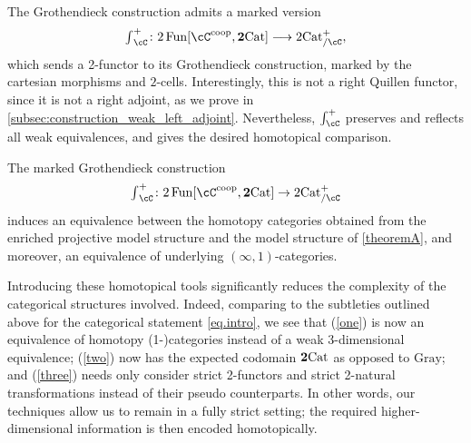 \documentclass[11pt, dvipsnames]{amsart}
\begin{document}
The Grothendieck construction admits a marked version 
\[
  {\textstyle\int}_\cC^+\colon 2\Fun[\cC^{\coop},\ttwocat]
  \longrightarrow \twocat^{+}_{/ \cC},
\]
which sends a 2-functor to its Grothendieck construction, marked by the cartesian morphisms and $2$-cells. Interestingly, this is not a right Quillen functor, since it is not a right adjoint, as we prove in \cref{subsec:construction_weak_left_adjoint}. %
Nevertheless, $\int_\cC^+$ preserves and reflects all weak equivalences, and gives the desired homotopical comparison. 
\begin{theoremA}
The marked Grothendieck construction
\[{\textstyle\int}_\cC^+\colon 2\Fun[\cC^{\coop},\ttwocat] \to\twocat^{+}_{/ \cC}\] 
induces an equivalence between the homotopy categories obtained from the enriched projective model structure and the model structure of \cref{theoremA}, and moreover, an equivalence of underlying $(\infty,1)$-categories.
\end{theoremA}

Introducing these homotopical tools significantly reduces the complexity of the categorical structures involved. Indeed, comparing to the subtleties outlined above for the categorical statement  \eqref{eq.intro}, we see that (\ref{one}) is now an equivalence of homotopy (1-)categories instead of a weak 3-dimensional equivalence; (\ref{two}) now has the expected codomain $\mathbf{2}\mathrm{Cat}$ as opposed to $\mathrm{Gray}$; and (\ref{three}) needs only consider strict 2-functors and strict 2-natural transformations instead of their pseudo counterparts. In other words, our techniques allow us to remain in a fully strict setting; the required higher-dimensional information is then encoded homotopically.
\end{document}
